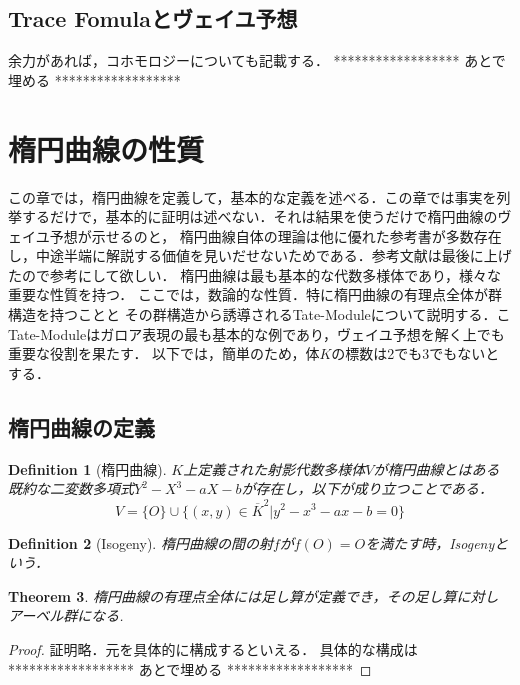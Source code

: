 \documentclass{ujarticle}
\newtheorem{thm}{Theorem}[section]
\newtheorem{dfn}[thm]{Definition}
\begin{document}
\subsection{Trace Fomulaとヴェイユ予想}
\label{sub:Trace Fomulaとヴェイユ予想}

余力があれば，コホモロジーについても記載する．
******************
 あとで埋める
******************

\section{楕円曲線の性質}
\label{sec:楕円曲線の性質}
この章では，楕円曲線を定義して，基本的な定義を述べる．この章では事実を列挙するだけで，基本的に証明は述べない．それは結果を使うだけで楕円曲線のヴェイユ予想が示せるのと，
楕円曲線自体の理論は他に優れた参考書が多数存在し，中途半端に解説する価値を見いだせないためである．参考文献は最後に上げたので参考にして欲しい．
楕円曲線は最も基本的な代数多様体であり，様々な重要な性質を持つ．
ここでは，数論的な性質．特に楕円曲線の有理点全体が群構造を持つことと
その群構造から誘導されるTate-Moduleについて説明する．こ
Tate-Moduleはガロア表現の最も基本的な例であり，ヴェイユ予想を解く上でも重要な役割を果たす．
以下では，簡単のため，体$K$の標数は2でも3でもないとする．

\subsection{楕円曲線の定義}
\label{sub:楕円曲線の定義}

\begin{dfn}[楕円曲線]
  $K$上定義された射影代数多様体$V$が楕円曲線とはある既約な二変数多項式$Y^2 - X^3 - aX - b$が存在し，以下が成り立つことである．
  \begin{equation*}
   V=\{O \} \cup \{ (x,y) \in \overline{K}^2 | y^2 - x^3 - ax - b=0 \}
  \end{equation*}
\end{dfn}

\begin{dfn}[Isogeny]
楕円曲線の間の射$f$が$f(O)=O$を満たす時，Isogenyという．
\end{dfn}

\begin{thm}
  楕円曲線の有理点全体には足し算が定義でき，その足し算に対しアーベル群になる.
\end{thm}
\begin{proof}
 証明略．元を具体的に構成するといえる．
 具体的な構成は
******************
  あとで埋める
******************
\end{proof}
\end{document}
